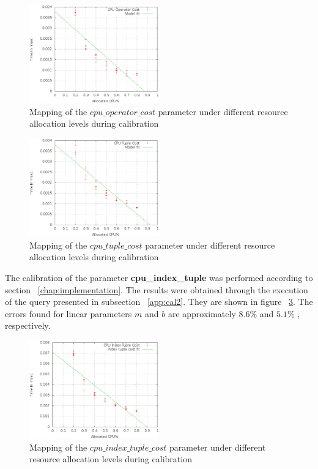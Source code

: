 \documentclass[jidm,a4paper]{jidm} %
\begin{document}
 
 \begin{figure}[t]
 \centering
 \includegraphics[width=0.5\textwidth]{cpu-operator-cost.eps}
 \caption{Mapping of the $cpu\_operator\_cost$ parameter under different resource allocation levels during calibration}
 \label{fig:cpuop}
 \end{figure} 
% 
% 
 \begin{figure}[t]
 \centering
 \includegraphics[width=0.5\textwidth]{cpu-tuple-cost.eps}
 \caption{Mapping of the $cpu\_tuple\_cost$ parameter under different resource allocation levels during calibration}
 \label{fig:cputp}
 \end{figure} 
 
 The calibration of the parameter \textbf{cpu\_index\_tuple} was performed according to section ~\ref{chap:implementation}. The results were obtained through the execution of the query presented in subsection ~\ref{app:cal2}. They are shown in figure ~\ref{fig:cpuip}. The errors found for linear parameters $m$ and $b$ are approximately $8.6\%$ and $5.1\%$ , respectively.

 \begin{figure}[t]
 \centering
 \includegraphics[width=0.5\textwidth]{cpu-index-tuple-cost.eps}
 \caption{Mapping of the $cpu\_index\_tuple\_cost$ parameter under different resource allocation levels during calibration}
 \label{fig:cpuip}
 \end{figure} 
 
\end{document}
